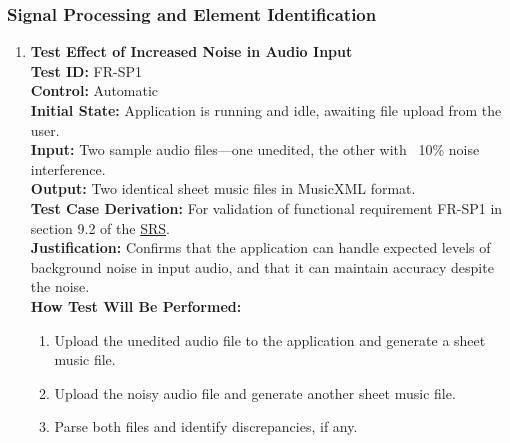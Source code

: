 \documentclass[12pt, titlepage]{article}
\begin{document}
  \subsubsection{Signal Processing and Element Identification}
  \label{FR-SP}
  \begin{enumerate}
    \item \textbf{Test Effect of Increased Noise in Audio Input} \\
      \newline
      \textbf{Test ID:} FR-SP1 \\
      \textbf{Control:} Automatic \\
      \textbf{Initial State:} Application is running and idle, awaiting file upload from the user. \\
      \textbf{Input:} Two sample audio files—one unedited, the other with ~10\% noise interference. \\
      \textbf{Output:} Two identical sheet music files in MusicXML format. \\
      \textbf{Test Case Derivation:} For validation of functional requirement FR-SP1 in section 9.2 of the 
      \href{https://github.com/emilyperica/ScoreGen/blob/main/docs/SRS-Volere/SRS.pdf}{SRS}. \\
      \textbf{Justification:} Confirms that the application can handle expected levels of background noise in input 
      audio, and that it can maintain accuracy despite the noise.\\
      \textbf{How Test Will Be Performed:}
      \begin{enumerate}
          \item Upload the unedited audio file to the application and generate a sheet music file.
          \item Upload the noisy audio file and generate another sheet music file.
          \item Parse both files and identify discrepancies, if any.
      \end{enumerate}
    

\end{enumerate}
\end{document}
